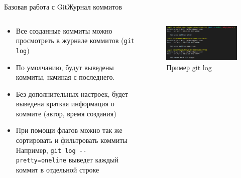 \begin{frame}{Базовая работа с Git}{Журнал коммитов}
    \begin{columns}
        \begin{column}{0.6\textwidth}
            \begin{itemize}
                \item
                      Все созданные коммиты можно просмотреть в журнале коммитов (\lstinline[style=BashInputStyle]{git log})
                \item
                      По умолчанию, будут выведены коммиты, начиная с последнего.
                \item
                    Без дополнительных настроек, будет выведена краткая информация о коммите (автор, время создания)
                \item
                      При помощи флагов можно так же сортировать и фильтровать коммиты
                      Например, \lstinline[style=BashInputStyle]{git log --pretty=oneline} выведет каждый коммит в отдельной строке
            \end{itemize}
        \end{column}
        \begin{column}{0.4\textwidth}
            \begin{figure}
                \centering
                \includegraphics[width=\textwidth]{images/git-log-example.png}
                \caption{Пример git log}
            \end{figure}
        \end{column}
    \end{columns}

\end{frame}